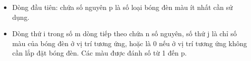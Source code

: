 \begin{itemize}
	\item     Dòng đầu tiên: chứa số nguyên p là số loại bóng đèn màu ít nhất cần sử dụng.   
	\item     Dòng thứ i trong số m dòng tiếp theo chứa n số nguyên, số thứ j là chỉ số màu của bóng đèn ở vị trí tương ứng, hoặc là 0 nếu ở vị trí tương ứng   không cần lắp đặt bóng đèn. Các màu được đánh số từ 1 đến p.   
\end{itemize}